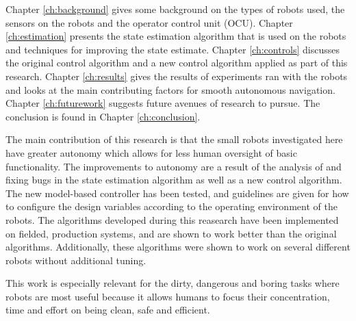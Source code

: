Chapter \ref{ch:background} gives some background on the types of robots used, the sensors on the robots and the operator control unit (OCU). Chapter \ref{ch:estimation} presents the state estimation algorithm that is used on the robots and techniques for improving the state estimate. Chapter \ref{ch:controls} discusses the original control algorithm and a new control algorithm applied as part of this research. Chapter \ref{ch:results} gives the results of experiments ran with the robots and looks at the main contributing factors for smooth autonomous navigation. Chapter \ref{ch:futurework} suggests future avenues of research to pursue. The conclusion is found in Chapter \ref{ch:conclusion}.

The main contribution of this research is that the small robots investigated here have greater autonomy which allows for less human oversight of basic functionality. The improvements to autonomy are a result of the analysis of and fixing bugs in the state estimation algorithm as well as a new control algorithm. The new model-based controller has been tested, and guidelines are given for how to configure the design variables according to the operating environment of the robots. The algorithms developed during this reasearch have been implemented on fielded, production systems, and are shown to work better than the original algorithms. Additionally, these algorithms were shown to work on several different robots without additional tuning.

This work is especially relevant for the dirty, dangerous and boring tasks where robots are most useful because it allows humans to focus their concentration, time and effort on being clean, safe and efficient.
